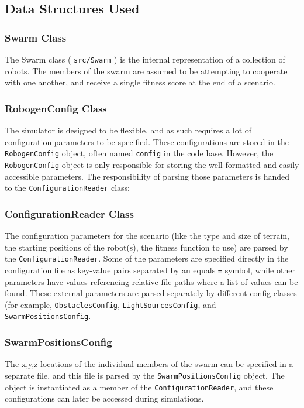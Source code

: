 \documentclass[11pt,a4paper]{article}
\begin{document}
\subsection{Data Structures Used}
\subsubsection{Swarm Class}
The Swarm class ( \texttt{src/Swarm} ) is the internal representation of a
collection of robots. The members of the swarm are assumed to be attempting to
cooperate with one another, and receive a single fitness score at the end of a
scenario.

\subsubsection{RobogenConfig Class}
The simulator is designed to be flexible, and as such requires a lot of
configuration parameters to be specified. These configurations are stored in
the \texttt{RobogenConfig} object, often named \texttt{config} in the code
base. However, the \texttt{RobogenConfig} object is only responsible for storing the
well formatted and easily accessible parameters. The responsibility of parsing
those parameters is handed to the \texttt{ConfigurationReader} class:

\subsubsection{ConfigurationReader Class}
The configuration parameters for the scenario (like the type and size of
terrain, the starting positions of the robot(s), the fitness function to use)
are parsed by the \texttt{ConfigurationReader}. Some of the parameters are
specified directly in the configuration file as key-value pairs separated by an
equals \texttt{=} symbol, while other parameters have values referencing
relative file paths where a list of values can be found. These external
parameters are parsed separately by different config classes (for example,
\texttt{ObstaclesConfig}, \texttt{LightSourcesConfig}, and
\texttt{SwarmPositionsConfig}.

\subsubsection{SwarmPositionsConfig}
The x,y,z locations of the individual members of the swarm can be specified in
a separate file, and this file is parsed by the \texttt{SwarmPositionsConfig}
object. The object is instantiated as a member of the
\texttt{ConfigurationReader}, and these configurations can later be accessed
during simulations.
\end{document}
